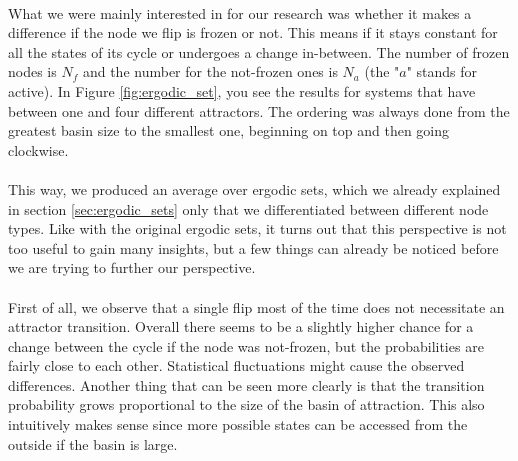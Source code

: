 \paragraph*{}
What we were mainly interested in for our research was whether it makes a difference if the node we flip is frozen or not. This means if it stays constant for all the states of its cycle or undergoes a change in-between. The number of frozen nodes is $N_f$ and the number for the not-frozen ones is $N_a$ (the "$a$" stands for active). In Figure \ref{fig:ergodic_set}, you see the results for systems that have between one and four different attractors. The ordering was always done from the greatest basin size to the smallest one, beginning on top and then going clockwise.

\paragraph*{}
This way, we produced an average over ergodic sets, which we already explained in section \ref{sec:ergodic_sets} only that we differentiated between different node types. Like with the original ergodic sets, it turns out that this perspective is not too useful to gain many insights, but a few things can already be noticed before we are trying to further our perspective.

\paragraph*{}
First of all, we observe that a single flip most of the time does not necessitate an attractor transition. Overall there seems to be a slightly higher chance for a change between the cycle if the node was not-frozen, but the probabilities are fairly close to each other. Statistical fluctuations might cause the observed differences. Another thing that can be seen more clearly is that the transition probability grows proportional to the size of the basin of attraction. This also intuitively makes sense since more possible states can be accessed from the outside if the basin is large.

